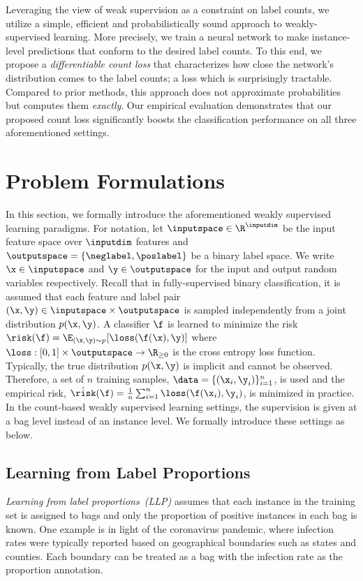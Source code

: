 \documentclass{article}
\begin{document}
Leveraging the view of weak supervision as a constraint on label counts, 
we utilize a simple, efficient and probabilistically sound approach to 
weakly-supervised learning.
More precisely, we train a neural network to make instance-level predictions 
that conform to the desired label counts.
To this end, we propose a \emph{differentiable count loss} that characterizes how close the network's distribution comes to the label counts; a loss which is surprisingly tractable.
Compared to prior methods, this approach does not approximate probabilities but computes them \emph{exactly}.
Our empirical evaluation demonstrates that our proposed count loss significantly 
boosts the classification performance on all three aforementioned settings.




\section{Problem Formulations}
\label{sec: problem formulation}


In this section, we formally introduce the aforementioned weakly supervised learning paradigms.
For notation,
let $\inputspace \in \R^{\inputdim}$ be the input feature space over $\inputdim$ features and $\outputspace = \{\neglabel, \poslabel\}$ be a binary label space. We write
$\x \in \inputspace$ and $\y \in \outputspace$ for the input and output random variables respectively.
Recall that in fully-supervised binary classification, it is assumed that each feature and label pair $(\x, \y) \in \inputspace \times \outputspace$ is sampled independently from a joint distribution $p(\x, \y)$.
A classifier $\f$ is learned to minimize the risk
$\risk(\f) = \E_{(\x, \y) \sim p} [\loss(\f(\x), \y)]$
where $\loss: [0, 1] \times \outputspace \rightarrow \R_{\geq 0}$ is the cross entropy loss function.
Typically, the true distribution $p(\x, \y)$ is implicit and cannot be observed.
Therefore, a set of $n$ training samples, $\data = \{(\x_i, \y_i)\}_{i = 1}^n$, is used and the empirical risk,
$\hat{\risk}(\f) = \frac{1}{n} \sum_{i = 1}^n \loss(\f(\x_i), \y_i)$,
is minimized in practice.
In the count-based weakly supervised learning settings, the supervision is given at a bag level instead of an instance level.
We formally introduce these settings as below.

\subsection{Learning from Label Proportions}
\label{sec: LLP intro}
\emph{Learning from label proportions~(LLP)} \citep{quadrianto2008llp} assumes that
each instance in the training set is assigned to bags and only the proportion of positive instances in each bag is known.
One example is in light of the coronavirus pandemic, where infection rates were typically reported based on geographical boundaries such as states and counties.
Each boundary can be treated as a bag with the infection rate as the proportion annotation.
\end{document}

